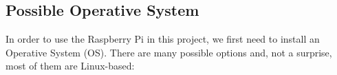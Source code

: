 
	\subsection{Possible Operative System}
	In order to use the Raspberry Pi in this project, we first need to install an Operative System (OS). There are many possible options and, not a surprise, most of them are Linux-based:

